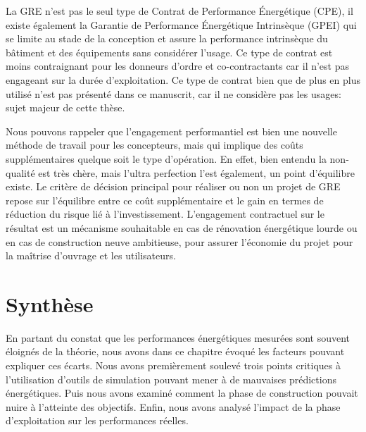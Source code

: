 La GRE n'est pas le seul type de Contrat de Performance Énergétique (CPE), il existe également la Garantie de Performance Énergétique Intrinsèque (GPEI) qui se limite au stade de la conception et assure la performance intrinsèque du bâtiment et des équipements sans considérer l'usage. Ce type de contrat est moins contraignant pour les donneurs d'ordre et co-contractants car il n'est pas engageant sur la durée d'exploitation. Ce type de contrat bien que de plus en plus utilisé n'est pas présenté dans ce manuscrit, car il ne considère pas les usages: sujet majeur de cette thèse.

Nous pouvons rappeler que l'engagement performantiel est bien une nouvelle méthode de travail pour les concepteurs, mais qui implique des coûts supplémentaires quelque soit le type d'opération. En effet, bien entendu la non-qualité est très chère, mais l'ultra perfection l'est également, un point d'équilibre existe. Le critère de décision principal pour réaliser ou non un projet de GRE repose sur l'équilibre entre ce coût supplémentaire et le gain en termes de réduction du risque lié à l'investissement. L'engagement contractuel sur le résultat est un mécanisme souhaitable en cas de rénovation énergétique lourde ou en cas de construction neuve ambitieuse, pour assurer l'économie du projet pour la maîtrise d'ouvrage et les utilisateurs. 

\section{Synthèse}

En partant du constat que les performances énergétiques mesurées sont souvent éloignés de la théorie, nous avons dans ce chapitre évoqué les facteurs pouvant expliquer ces écarts. Nous avons premièrement soulevé trois points critiques à l'utilisation d'outils de simulation pouvant mener à de mauvaises prédictions énergétiques. Puis nous avons examiné comment la phase de construction pouvait nuire à l'atteinte des objectifs. Enfin, nous avons analysé l'impact de la phase d'exploitation sur les performances réelles. 

